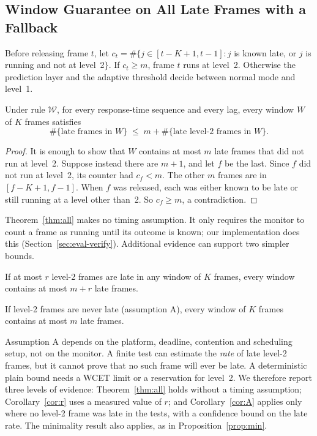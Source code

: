 \documentclass[acmsmall,screen]{acmart}
\newcommand{\Wl}{$\mathcal{W}$}
\begin{document}
\subsection{Window Guarantee on All Late Frames with a Fallback}\label{sec:all}

\begin{definition}[Rule \Wl]
Before releasing frame $t$, let $c_t=\#\{j\in[t-K+1,t-1]: j$ is known late, or $j$ is running and not at level~2$\}$. If $c_t\ge m$,
frame $t$ runs at level~2. Otherwise the prediction layer and the adaptive threshold decide between normal mode and level~1.
\end{definition}

\begin{theorem}\label{thm:all}
Under rule \Wl, for every response-time sequence and every lag, every window $W$ of $K$ frames satisfies
\[\#\{\text{late frames in }W\}\;\le\;m+\#\{\text{late level-2 frames in }W\}.\]
\end{theorem}
\begin{proof}
It is enough to show that $W$ contains at most $m$ late frames that did not run at level~2. Suppose instead there are $m+1$, and let $f$ be the last. Since $f$ did not run at level~2, its counter had $c_f<m$. The other $m$ frames are in $[f-K+1,f-1]$. When $f$ was released, each was either known to be late or still running at a level other than~2. So $c_f\ge m$, a contradiction.
\end{proof}

Theorem~\ref{thm:all} makes no timing assumption. It only requires the monitor to count a frame as running until its outcome is known; our implementation does this (Section~\ref{sec:eval-verify}). Additional evidence can support two simpler bounds.

\begin{corollary}\label{cor:r}
If at most $r$ level-2 frames are late in any window of $K$ frames, every window contains at most $m+r$ late frames.
\end{corollary}

\begin{corollary}\label{cor:A}
If level-2 frames are never late (assumption A), every window of $K$ frames contains at most $m$ late frames.
\end{corollary}

Assumption A depends on the platform, deadline, contention and scheduling setup, not on the monitor. A finite test can estimate the \emph{rate} of late level-2 frames, but it cannot prove that no such frame will ever be late. A deterministic plain bound needs a WCET limit or a reservation for level~2. We therefore report three levels of evidence: Theorem~\ref{thm:all} holds without a timing assumption; Corollary~\ref{cor:r} uses a measured value of $r$; and Corollary~\ref{cor:A} applies only where no level-2 frame was late in the tests, with a confidence bound on the late rate. The minimality result also applies, as in Proposition~\ref{prop:min}.
\end{document}

